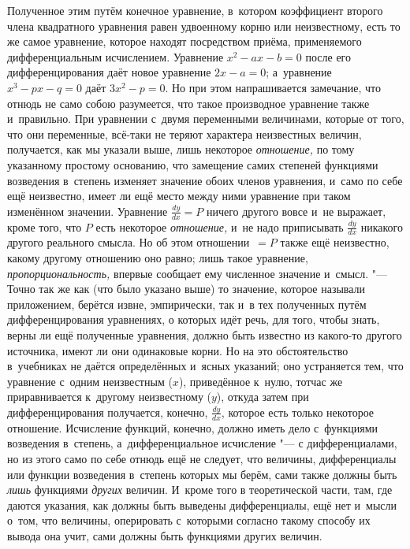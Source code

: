 Полученное этим путём конечное уравнение, в~котором коэффициент второго члена
квадратного уравнения равен удвоенному корню или неизвестному, есть то же самое
уравнение, которое находят посредством приёма, применяемого дифференциальным
исчислением. Уравнение $x^2-ax-b=0$ после его дифференцирования даёт новое
уравнение $2x-a=0$; а~уравнение $x^3-px-q=0$ даёт $3x^2-p=0$. Но при этом
напрашивается замечание, что отнюдь не само собою разумеется, что такое
производное уравнение также и~правильно. При уравнении с~двумя переменными
величинами, которые от того, что они переменные, всё-таки не теряют характера
неизвестных величин, получается, как мы указали выше, лишь некоторое
{\em отношение,} по тому указанному простому основанию, что замещение самих
степеней функциями возведения в~степень изменяет значение обоих членов
уравнения, и~само по себе ещё неизвестно, имеет ли ещё место между ними
уравнение при таком изменённом значении. Уравнение $\frac{dy}{dx}=P$ ничего
другого вовсе и~не выражает, кроме того, что $P$ есть некоторое
{\em отношение,} и~не надо приписывать $\frac{dy}{dx}$ никакого другого
реального смысла. Но об этом отношении~$=P$ также ещё неизвестно, какому
другому отношению оно равно; лишь такое уравнение, {\em пропорциональность,}
впервые сообщает ему численное значение и~смысл. "--- Точно так же как (что
было указано выше) то значение, которое называли приложением, берётся извне,
эмпирически, так и~в тех полученных путём дифференцирования уравнениях, о
которых идёт речь, для того, чтобы знать, верны ли ещё полученные уравнения,
должно быть известно из какого-то другого источника, имеют ли они одинаковые
корни. Но на это обстоятельство в~учебниках не даётся определённых и~ясных
указаний; оно устраняется тем, что уравнение с~одним неизвестным ($x$),
приведённое к~нулю, тотчас же приравнивается к~другому неизвестному ($y$),
откуда затем при дифференцирования получается, конечно, $\frac{dy}{dx}$,
которое есть только некоторое отношение. Исчисление функций, конечно, должно
иметь дело с~функциями возведения в~степень, а~дифференциальное исчисление "--- с
дифференциалами, но из этого само по себе отнюдь ещё не следует, что величины,
дифференциалы или функции возведения в~степень которых мы берём, сами также
должны быть {\em лишь} функциями {\em других} величин. И~кроме того в
теоретической части, там, где даются указания, как должны быть выведены
дифференциалы, ещё нет и~мысли о~том, что величины, оперировать с~которыми
согласно такому способу их вывода она учит, сами должны быть функциями других
величин.

